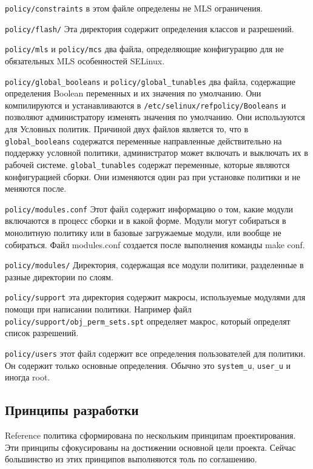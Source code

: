 \documentclass{./../class/UIR}
\begin{document}
	\begin{description}
	  \item \verb"policy/constraints"  в этом файле определены не MLS ограничения.
	  \item \verb"policy/flash/"  Эта директория содержит определения классов и
	  разрешений.
	  \item \verb"policy/mls"  и \verb"policy/mcs" два файла, определяющие
	  конфигурацию для не обязательных MLS особенностей  SELinux.
	  \item \verb"policy/global_booleans" и \verb"policy/global_tunables" два
	  файла, содержащие определения Boolean переменных и их значения по умолчанию.
	  Они компилируются и устанавливаются в \verb"/etc/selinux/refpolicy/Booleans"
	  и позволяют администратору изменять значения по умолчанию. Они используются
	  для Условных политик. Причиной двух файлов является то, что в
	  \verb"global_booleans" содержатся переменные направленные действительно на
	  поддержку условной политики, администратор может включать и выключать их в рабочей системе.
	  \verb"global_tunables"  содержат переменные, которые являются конфигурацией
	  сборки.
	  Они изменяются один раз при установке политики и не меняются после.
	  \item  \verb"policy/modules.conf" Этот файл содержит
	  информацию о том, какие модули включаются в процесс сборки и в какой форме.
      Модули могут собираться в монолитную политику или в базовые загружаемые модули,
      или вообще не собираться. Файл modules.conf
	  создается после выполнения команды make conf.
	  \item \verb"policy/modules/" Директория, содержащая
	  все модули политики, разделенные в разные директории по слоям.
	  \item \verb"policy/support" эта директория содержит макросы, используемые
	  модулями для помощи при написании политики. Например
	  файл \verb"policy/support/obj_perm_sets.spt"  определяет макрос, который
	  определят список разрешений.
	  \item \verb"policy/users"  этот файл содержит все определения пользователей
	  для политики. Он содержит только основные определения.
	  Обычно это \verb"system_u", \verb"user_u" и иногда root.
	\end{description}
	
\subsection{Принципы разработки}
	Reference политика сформирована по нескольким принципам проектирования. Эти
	принципы сфокусированы на достижении основной цели проекта. Сейчас большинство
	из этих принципов выполняются толь по соглашению.
\end{document}
